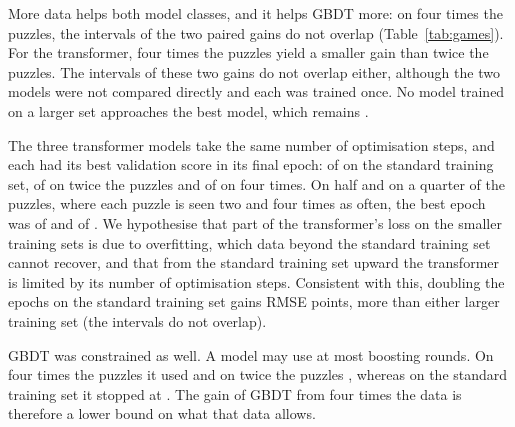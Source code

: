 \documentclass[11pt]{article}
\begin{document}
More data helps both model classes, and it helps GBDT more: on four times
the puzzles, the intervals of the two paired gains do not overlap
(Table~\ref{tab:games}). For the transformer, four times the puzzles yield a
smaller gain than twice the puzzles. The intervals of these two gains do not
overlap either, although the two models were not compared directly and each
was trained once. No model trained on a larger set approaches the best
model, which remains .

The three transformer models take the same number of optimisation steps, and
each had its best validation score in its final epoch:
 of
 on the standard training set,
 of
 on twice the puzzles and
 of
 on four times. On half and
on a quarter of the puzzles, where each puzzle is seen two and four times as
often, the best epoch was  of
 and
 of
. We hypothesise that part of
the transformer's loss on the smaller training sets is due to overfitting,
which data beyond the standard training set cannot recover, and that from
the standard training set upward the transformer is limited by its number of
optimisation steps.
\ifchangeepochs
Consistent with this, doubling the epochs on the standard training set gains
 RMSE
points, more than either larger training set (the intervals do not overlap).
\fi

GBDT was constrained as well. A model may use at most
 boosting rounds. On four times the puzzles it used
 and on twice the puzzles
, whereas on the standard training set it
stopped at . The gain of GBDT from four times the data
is therefore a lower bound on what that data allows.
\fi



\iffeatures
\end{document}
